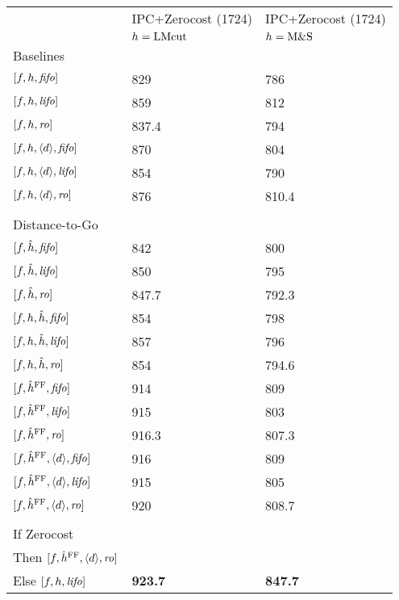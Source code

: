 \begin{center}
\begin{tabular}{|l|l|l|}
\hline
 & IPC+Zerocost (1724) & IPC+Zerocost (1724)\\
 & \(h=\lmcut\) & \(h=\mands\)\\
\hline
Baselines &  & \\
\([f,h,\fifo]\) & 829 & 786\\
\([f,h,\lifo]\) & 859 & 812\\
\([f,h,\ro]\) & 837.4 & 794\\
\([f,h,\depth,\fifo]\) & 870 & 804\\
\([f,h,\depth,\lifo]\) & 854 & 790\\
\([f,h,\depth,\ro]\) & 876 & 810.4\\
 &  & \\
Distance-to-Go &  & \\
\([f,\hat{h},\fifo]\) & 842 & 800\\
\([f,\hat{h},\lifo]\) & 850 & 795\\
\([f,\hat{h},\ro]\) & 847.7 & 792.3\\
\([f,h,\hat{h},\fifo]\) & 854 & 798\\
\([f,h,\hat{h},\lifo]\) & 857 & 796\\
\([f,h,\hat{h},\ro]\) & 854 & 794.6\\
\([f,\ffo,\fifo]\) & 914 & 809\\
\([f,\ffo,\lifo]\) & 915 & 803\\
\([f,\ffo,\ro]\) & 916.3 & 807.3\\
\([f,\ffo,\depth,\fifo]\) & 916 & 809\\
\([f,\ffo,\depth,\lifo]\) & 915 & 805\\
\([f,\ffo,\depth,\ro]\) & 920 & 808.7\\
 &  & \\
If Zerocost &  & \\
Then \([f,\ffo,\depth,\ro]\) &  & \\
Else \([f,h,\lifo]\) & \textbf{923.7} & \textbf{847.7}\\
\hline
\end{tabular}
\end{center}
